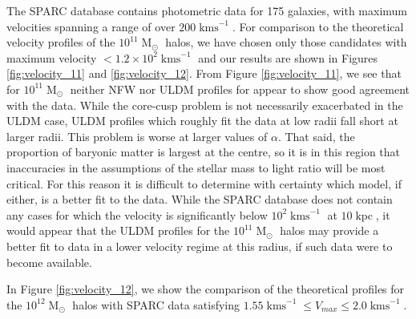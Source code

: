 \documentclass[a4paper,11pt]{article}
\begin{document}
The SPARC database contains photometric data for 175 galaxies, with maximum velocities spanning a range of over $200 \operatorname{kms}^{-1}$. For comparison to the theoretical velocity profiles of the $10^{11}\operatorname{M}_{\odot}$ halos, we have chosen only those candidates with maximum velocity $< 1.2\times 10^2 \operatorname{kms}^{-1}$ and our results are shown in Figures \ref{fig:velocity_11} and \ref{fig:velocity_12}. From Figure \ref{fig:velocity_11}, we see that for $10^{11}\operatorname{M}_{\odot}$  neither  NFW nor  ULDM profiles for appear to show good agreement with the data. While the core-cusp problem is not necessarily exacerbated in the ULDM case, ULDM profiles which roughly fit the data at low radii fall short at larger radii. This problem is worse at larger values of $\alpha$. That said, the proportion of baryonic matter is largest at the centre, so it is in this region that inaccuracies in the assumptions of the stellar mass to light ratio will be most critical.  For this reason it is difficult to determine with certainty which model, if either, is a better fit to the data. While the SPARC database does not contain any cases for which the velocity is significantly below $10^2\operatorname{kms}^{-1}$ at $10 \operatorname{kpc}$, it would appear that the ULDM profiles for the $10^{11}\operatorname{M}_{\odot}$ halos may provide a better fit to data in a lower velocity regime at this radius, if such data were to become available.  

In Figure \ref{fig:velocity_12}, we show the comparison of the theoretical profiles for the $10^{12}\operatorname{M}_{\odot}$ halos with SPARC data satisfying $1.55 \operatorname{kms}^{-1}\leq V_{max}\leq 2.0 \operatorname{kms}^{-1}$.
\end{document}
